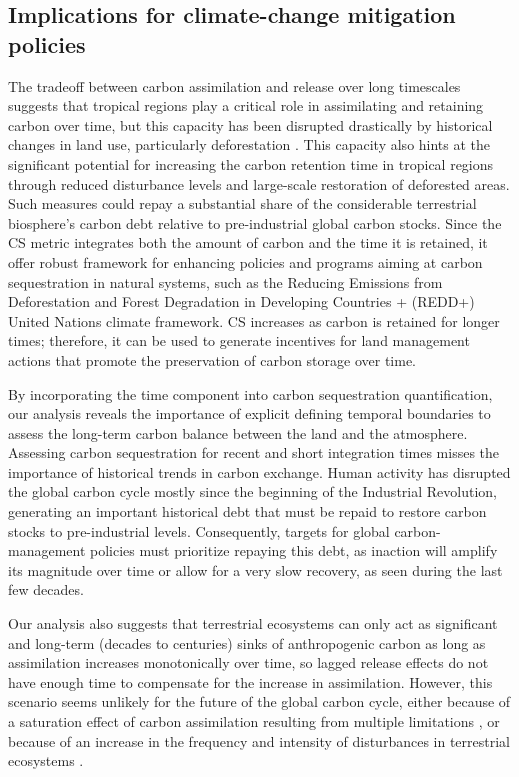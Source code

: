 \documentclass[9pt,twocolumn,twoside]{pnas-new}
\begin{document}
\subsection*{Implications for climate-change mitigation policies}
The tradeoff between carbon assimilation and release over long timescales suggests that tropical regions play a critical role in assimilating and retaining carbon over time, but this capacity has been disrupted drastically by historical changes in land use, particularly deforestation \cite{Li2022}. This capacity also hints at the significant potential for increasing the carbon retention time in tropical regions through reduced disturbance levels and large-scale restoration of deforested areas. Such measures could repay a substantial share of the considerable terrestrial biosphere's carbon debt relative to pre-industrial global carbon stocks. Since the CS metric integrates both the amount of carbon and the time it is retained, it offer robust framework for enhancing policies and programs aiming at carbon sequestration in natural systems, such as the Reducing Emissions from Deforestation and Forest Degradation in Developing Countries + (REDD+) United Nations climate framework. CS increases as carbon is retained for longer times; therefore, it can be used to generate incentives for land management actions that promote the preservation of carbon storage over time. 


By incorporating the time component into carbon sequestration quantification, our analysis reveals the importance of explicit defining temporal boundaries to assess the long-term carbon balance between the land and the atmosphere. Assessing carbon sequestration for recent and short integration times misses the importance of historical trends in carbon exchange. Human activity has disrupted the global carbon cycle mostly since the beginning of the Industrial Revolution, generating an important historical debt that must be repaid to restore carbon stocks to pre-industrial levels. Consequently, targets for global carbon-management policies must prioritize repaying this debt, as inaction will amplify its magnitude over time or allow for a very slow recovery, as seen during the last few decades.

Our analysis also suggests that terrestrial ecosystems can only act as significant and long-term (decades to centuries) sinks of anthropogenic carbon as long as assimilation increases monotonically over time, so lagged release effects do not have enough time to compensate for the increase in assimilation. However, this scenario seems unlikely for the future of the global carbon cycle, either because of a saturation effect of carbon assimilation resulting from multiple limitations \cite{Melnikova2021,Friedlingstein2023}, or because of an increase in the frequency and intensity of disturbances in terrestrial ecosystems \cite{Xu2021,Sitch2024}.
\end{document}
